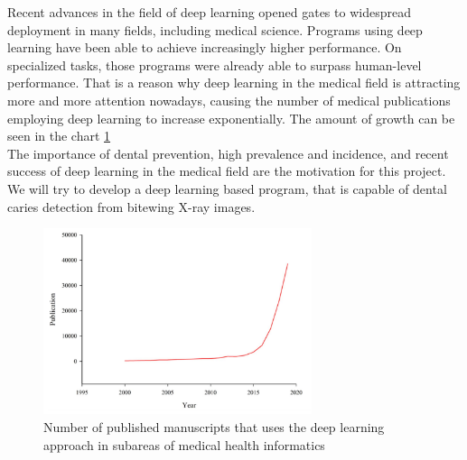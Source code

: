Recent advances in the field of deep learning opened gates to widespread deployment in many fields, including medical science. Programs using deep learning have been able to achieve increasingly higher performance. On specialized tasks, those programs were already able to surpass human-level performance. That is a reason why  deep learning in the medical field is attracting more and more attention nowadays, causing the number of medical publications employing deep learning to increase exponentially. The amount of growth can be seen in the chart \ref{fig:med_pub} \\
The importance of dental prevention, high prevalence and incidence, and recent success of deep learning in the medical field are the motivation for this project. We will try to develop a deep learning based program, that is capable of dental caries detection from bitewing X-ray images.
\begin{figure}
    \centering
    \includegraphics[width=0.7\textwidth]{images/num_publication.png}
    \caption{\label{fig:med_pub}Number of published manuscripts that uses the deep learning approach in subareas of medical health informatics \cite{Bhatt2020}}
\end{figure}